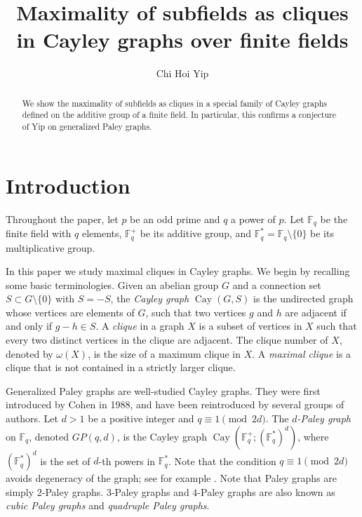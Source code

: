 \documentclass[12pt,reqno]{amsart}
\newcommand{\F}{\mathbb{F}}
\begin{document}
\title{Maximality of subfields as cliques in Cayley graphs over finite fields}
\author{Chi Hoi Yip}
\address{Department of Mathematics \\ University of British Columbia \\ 1984 Mathematics Road \\ Vancouver  V6T 1Z2 \\ Canada}

\maketitle

\begin{abstract}
We show the maximality of subfields as cliques in a special family of Cayley graphs defined on the additive group of a finite field. In particular, this confirms a conjecture of Yip on generalized Paley graphs.
\end{abstract}

\section{Introduction}

Throughout the paper, let $p$ be an odd prime and $q$ a power of $p$. Let $\F_q$ be the finite field with $q$ elements, $\F_q^+$ be its additive group, and $\F_q^*=\F_q \setminus \{0\}$ be its multiplicative group. 

In this paper we study maximal cliques in Cayley graphs. We begin by recalling some basic terminologies. Given an abelian group $G$ and a connection set $S \subset G \setminus \{0\}$ with $S=-S$, the {\em Cayley graph} $\operatorname{Cay}(G,S)$ is
the undirected graph whose vertices are elements of $G$, such that two vertices $g$ and $h$ are adjacent if and only if $g-h \in S$. A {\em clique} in a graph $X$ is a subset of vertices in $X$ such that every two distinct vertices in the clique are adjacent. The clique number of $X$, denoted by $\omega(X)$, is the size of a maximum clique in $X$. A {\em maximal clique} is a clique that is not contained in a strictly larger clique. 

Generalized Paley graphs are well-studied Cayley graphs. They were first introduced by Cohen \cite{SC} in 1988, and have been reintroduced by several groups of authors. Let $d>1$ be a positive integer and $q \equiv 1 \pmod {2d}$. The {\em $d$-Paley graph} on $\F_q$, denoted $GP(q,d)$, is the Cayley graph $\operatorname{Cay}(\F_q^+;(\F_q^*)^d)$, where $(\F_q^*)^d$ is the set of $d$-th powers in $\F_q^*$. Note that the condition $q \equiv 1 \pmod {2d}$ avoids degeneracy of the graph; see for example \cite[Section 4]{SC}. Note that Paley graphs are simply $2$-Paley graphs. $3$-Paley graphs and $4$-Paley graphs are also known as \emph{cubic Paley graphs} and \emph{quadruple Paley graphs}. 
\end{document}
